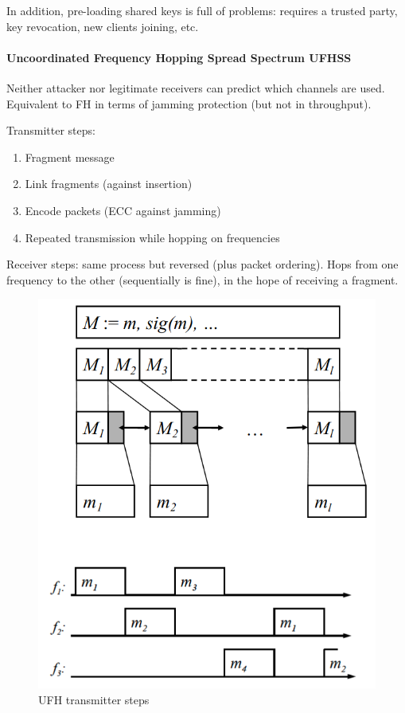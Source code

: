 In addition, pre-loading shared keys is full of problems:
requires a trusted party, key revocation, new clients joining, etc.

\paragraph{Uncoordinated Frequency Hopping Spread Spectrum UFHSS}
Neither attacker nor legitimate receivers can predict which channels are used.
Equivalent to FH in terms of jamming protection (but not in throughput).

Transmitter steps:
\begin{enumerate}
	\item Fragment message
	\item Link fragments (against insertion)
	\item Encode packets (ECC against jamming)
	\item Repeated transmission while hopping on frequencies
\end{enumerate}

Receiver steps: same process but reversed (plus packet ordering).
Hops from one frequency to the other (sequentially is fine), in the hope of receiving a fragment.

\begin{figure}[h]
	\centering
	\includegraphics[scale=0.4]{images/3-ufh.png}
	\caption{UFH transmitter steps}
	\label{fig:ufh}
\end{figure}

